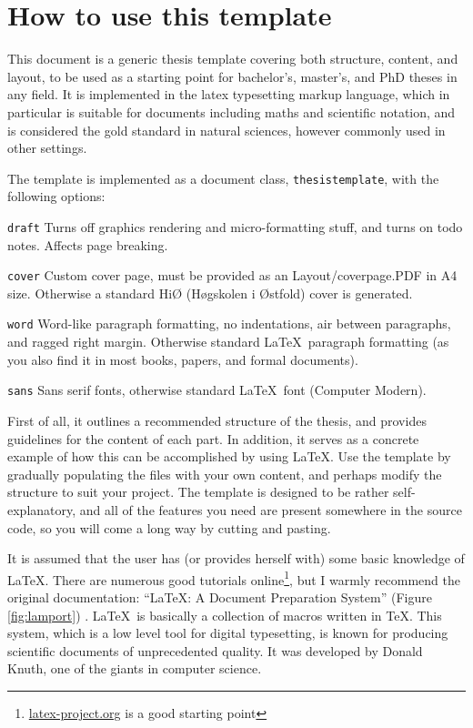 \chapter{How to use this template}
\label{chap:how-to} 

This document is a generic thesis template covering both structure, content, and layout, to be used as a starting point for bachelor's, master's, and PhD theses in any field. 
It is implemented in the \gls{latex} typesetting markup language, which in particular is suitable 
for documents including \gls{maths} 
and scientific notation, and is considered the gold standard in natural sciences, however commonly used in other settings.

The template is implemented as a document class, 
\texttt{thesistemplate}, with the following options:

\begin{compactdesc}
\item [\texttt{draft}] Turns off graphics rendering and micro-formatting stuff, and turns on todo notes. Affects page breaking.
\item [\texttt{cover}] Custom cover page, must be provided as an Layout/coverpage.PDF in A4 size. Otherwise a standard HiØ (Høgskolen i Østfold) cover is generated.
\item [\texttt{word}] Word-like paragraph formatting, no indentations, air between paragraphs, and ragged right margin. Otherwise standard \LaTeX\ paragraph formatting (as you also find it in most books, papers, and formal documents).
\item [\texttt{sans}] Sans serif fonts, otherwise standard \LaTeX\ font (Computer Modern).
\end{compactdesc}

First of all, it outlines a recommended structure of the thesis, and provides guidelines for the content of each part.
In addition, it serves as a concrete example of how this can be accomplished by using \LaTeX. Use the template by gradually populating the files with your own content, and perhaps modify the structure to suit your project. The template is designed to be rather self-explanatory, and all of the features you need are present somewhere in the source code, so you will come a long way by cutting and pasting.

It is assumed that the user has (or provides herself with) some basic knowledge of \LaTeX. There are numerous good tutorials online\footnote{\url{latex-project.org} is a good starting point}, but I warmly recommend the original documentation: ``\LaTeX: A Document Preparation System'' (Figure \ref{fig:lamport})  \parencite{lamport94ldp}. \LaTeX\ is basically a collection of macros written in \TeX.
This system, which is a low level tool for digital typesetting, is known for producing scientific documents of unprecedented quality. It was developed by Donald Knuth, one of the giants in computer science.

